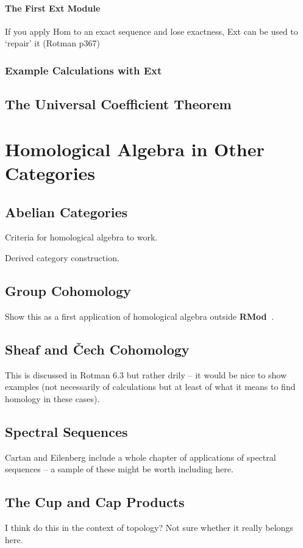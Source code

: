 \documentclass[oneside,english]{amsbook}
\numberwithin{section}{chapter}
\theoremstyle{plain}
\theoremstyle{definition}
\providecommand{\Cech}{\v{C}ech }
\newcommand{\catname}[1]{{\normalfont\textbf{#1}}}
\newcommand{\RMod}{\catname{RMod\ }}
\begin{document}
			\subsection{The First Ext Module}
			
				If you apply Hom to an exact sequence and lose exactness, Ext can be used to `repair' it (Rotman p367)
		\section{Example Calculations with Ext}
		

	\chapter{The Universal Coefficient Theorem}
		

	\part{Homological Algebra in Other Categories}
	
	\chapter{Abelian Categories}
	
		Criteria for homological algebra to work.
		
		Derived category construction.
	
	\chapter{Group Cohomology}
	
		Show this as a first application of homological algebra outside \RMod.
	
	\chapter{Sheaf and \Cech Cohomology}

		This is discussed in Rotman 6.3 but rather drily -- it would be nice to show examples (not necessarily of calculations but at least of what it means to find homology in these cases).
		
	\chapter{Spectral Sequences}

		Cartan and Eilenberg include a whole chapter of applications of spectral sequences -- a sample of these might be worth including here.

	\chapter{The Cup and Cap Products}

		I think do this in the context of topology? Not sure whether it really belongs here.
	
	
\end{document}
